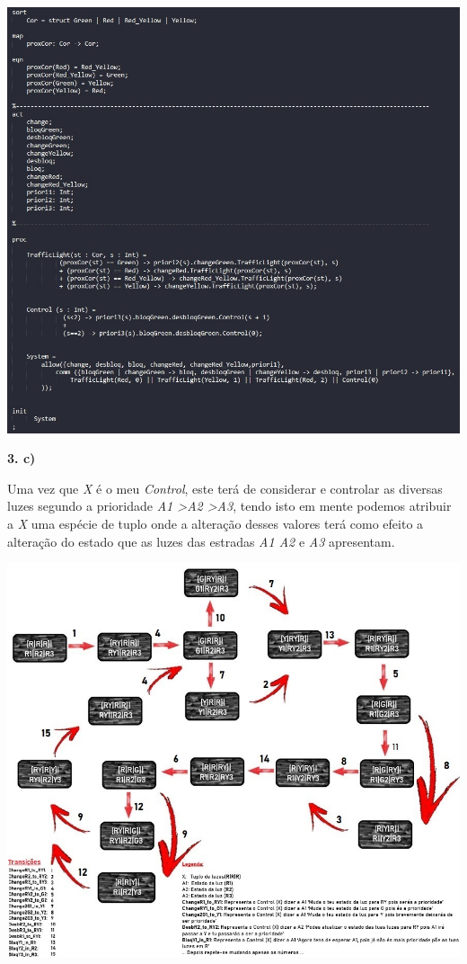 \documentclass[11pt,a4paper]{report}
\begin{document}
\begin{minipage}{0.9\linewidth}
        \centering
		\includegraphics[width=\textwidth]{Ex3.jpeg}\par\vspace{1cm}
\end{minipage}

\textbf{3. c)}

Uma vez que \emph{X} é o meu \emph{Control}, este terá de considerar e controlar as diversas luzes segundo a prioridade \emph{A1 \textendash\textgreater  A2 \textendash\textgreater A3}, tendo isto em mente podemos atribuir a \emph{X} uma espécie de tuplo onde a alteração desses valores terá como efeito a alteração do estado que as luzes das estradas \emph{A1 A2} e \emph{A3} apresentam. 

\begin{minipage}{0.9\linewidth}
        \centering
		\includegraphics[width=\textwidth]{Ex33.jpeg}\par\vspace{1cm}
\end{minipage}
\end{document}
